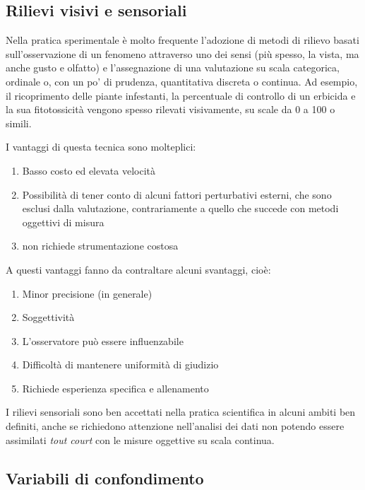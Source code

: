 \documentclass[a4paper,12pt,oneside]{book}
\providecommand{\tightlist}{%
  \setlength{\itemsep}{0pt}\setlength{\parskip}{0pt}}
\begin{document}
\hypertarget{rilievi-visivi-e-sensoriali}{%
\subsection{Rilievi visivi e sensoriali}\label{rilievi-visivi-e-sensoriali}}

Nella pratica sperimentale è molto frequente l'adozione di metodi di rilievo basati sull'osservazione di un fenomeno attraverso uno dei sensi (più spesso, la vista, ma anche gusto e olfatto) e l'assegnazione di una valutazione su scala categorica, ordinale o, con un po' di prudenza, quantitativa discreta o continua. Ad esempio, il ricoprimento delle piante infestanti, la percentuale di controllo di un erbicida e la sua fitotossicità vengono spesso rilevati visivamente, su scale da 0 a 100 o simili.

I vantaggi di questa tecnica sono molteplici:

\begin{enumerate}
\def\labelenumi{\arabic{enumi}.}
\tightlist
\item
  Basso costo ed elevata velocità
\item
  Possibilità di tener conto di alcuni fattori perturbativi esterni, che sono esclusi dalla valutazione, contrariamente a quello che succede con metodi oggettivi di misura
\item
  non richiede strumentazione costosa
\end{enumerate}

A questi vantaggi fanno da contraltare alcuni svantaggi, cioè:

\begin{enumerate}
\def\labelenumi{\arabic{enumi}.}
\tightlist
\item
  Minor precisione (in generale)
\item
  Soggettività
\item
  L'osservatore può essere influenzabile
\item
  Difficoltà di mantenere uniformità di giudizio
\item
  Richiede esperienza specifica e allenamento
\end{enumerate}

I rilievi sensoriali sono ben accettati nella pratica scientifica in alcuni ambiti ben definiti, anche se richiedono attenzione nell'analisi dei dati non potendo essere assimilati \emph{tout court} con le misure oggettive su scala continua.

\hypertarget{variabili-di-confondimento}{%
\subsection{Variabili di confondimento}\label{variabili-di-confondimento}}
\end{document}
